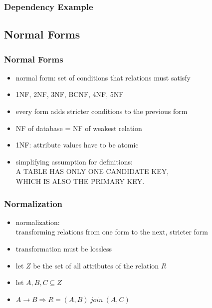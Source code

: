 \documentclass[dvipsnames]{beamer}
\begin{document}
\begin{frame}
  \frametitle{Dependency Example}

  \begin{center}
  \end{center}
\end{frame}

\subsection{Normal Forms}

\begin{frame}
  \frametitle{Normal Forms}

  \begin{itemize}
    \item normal form: set of conditions that relations must satisfy

    \medskip
    \item 1NF, 2NF, 3NF, BCNF, 4NF, 5NF
    \item every form adds stricter conditions to the previous form
    \item NF of database = NF of weakest relation

    \pause
    \medskip
    \item \alert{1NF}: attribute values have to be atomic

    \pause
    \medskip
    \item simplifying assumption for definitions:\\
      \alert{A TABLE HAS ONLY ONE CANDIDATE KEY,\\
        WHICH IS ALSO THE PRIMARY KEY.}
  \end{itemize}
\end{frame}

\begin{frame}
  \frametitle{Normalization}

  \begin{itemize}
    \item \alert{normalization}:\\
      transforming relations from one form to the next, stricter form

    \item transformation must be lossless
  \end{itemize}

  \pause
  \begin{theorem}[Heath]
    \begin{itemize}
      \item let $Z$ be the set of all attributes of the relation $R$
      \item let $A,B,C \subseteq Z$

      \medskip
      \item $A \rightarrow B \Rightarrow R = (A,B) ~join~ (A,C)$
    \end{itemize}
  \end{theorem}
\end{frame}
\end{document}
